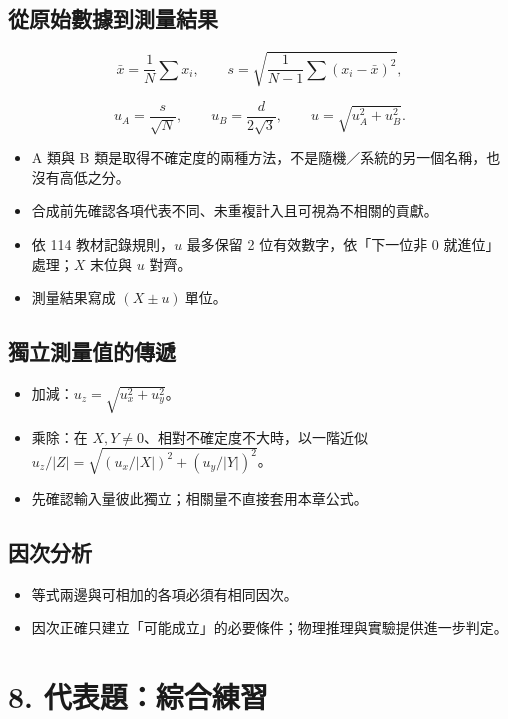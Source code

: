 \documentclass[11pt,a4paper]{article}
\providecommand{\tightlist}{%
  \setlength{\itemsep}{0pt}\setlength{\parskip}{0pt}}
\begin{document}
\subsection{從原始數據到測量結果}\label{ux5f9eux539fux59cbux6578ux64daux5230ux6e2cux91cfux7d50ux679c}

\[
\bar x=\frac1N\sum x_i,
\qquad
s=\sqrt{\frac{1}{N-1}\sum(x_i-\bar x)^2},
\]

\[
u_A=\frac{s}{\sqrt N},
\qquad
u_B=\frac{d}{2\sqrt3},
\qquad
u=\sqrt{u_A^2+u_B^2}.
\]

\begin{itemize}
\tightlist
\item
  A 類與 B 類是取得不確定度的兩種方法，不是隨機／系統的另一個名稱，也沒有高低之分。
\item
  合成前先確認各項代表不同、未重複計入且可視為不相關的貢獻。
\item
  依 114 教材記錄規則，\(u\) 最多保留 2 位有效數字，依「下一位非 0 就進位」處理；\(X\) 末位與 \(u\) 對齊。
\item
  測量結果寫成 \((X\pm u)\ \text{單位}\)。
\end{itemize}

\subsection{獨立測量值的傳遞}\label{ux7368ux7acbux6e2cux91cfux503cux7684ux50b3ux905e}

\begin{itemize}
\tightlist
\item
  加減：\(u_z=\sqrt{u_x^2+u_y^2}\)。
\item
  乘除：在 \(X,Y\ne0\)、相對不確定度不大時，以一階近似
  \(u_z/|Z|=\sqrt{(u_x/|X|)^2+(u_y/|Y|)^2}\)。
\item
  先確認輸入量彼此獨立；相關量不直接套用本章公式。
\end{itemize}

\subsection{因次分析}\label{ux56e0ux6b21ux5206ux6790}

\begin{itemize}
\tightlist
\item
  等式兩邊與可相加的各項必須有相同因次。
\item
  因次正確只建立「可能成立」的必要條件；物理推理與實驗提供進一步判定。
\end{itemize}

\section{8. 代表題：綜合練習}\label{ux4ee3ux8868ux984cux7d9cux5408ux7df4ux7fd2}
\end{document}
